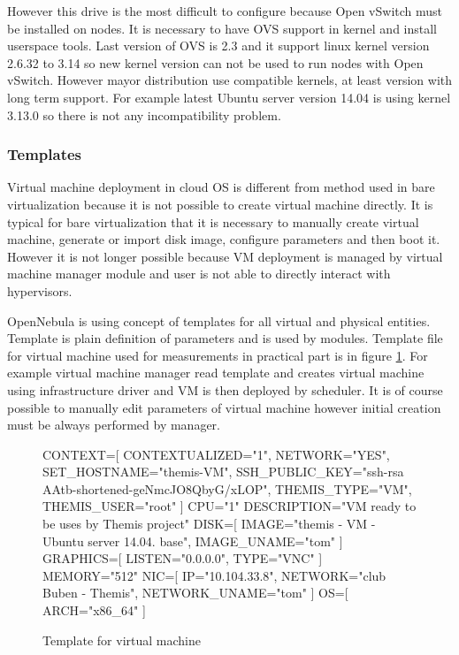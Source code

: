 However this drive is the most difficult to configure because Open vSwitch must be installed on nodes. It is necessary to have \Ac{OVS} support in kernel and install userspace tools. Last version of \Ac{OVS} is 2.3 and it support linux kernel version 2.6.32 to 3.14 so new kernel version can not be used to run nodes with Open vSwitch. However mayor distribution use compatible kernels, at least version with long term support. For example latest Ubuntu server version 14.04 is using kernel 3.13.0 so there is not any incompatibility problem.

\subsubsection{Templates}
Virtual machine deployment in cloud \Ac{OS} is different from method used in bare virtualization because it is not possible to create virtual machine directly. It is typical for bare virtualization that it is necessary to manually create virtual machine, generate or import disk image, configure parameters and then boot it. However it is not longer possible because \Ac{VM} deployment is managed by virtual machine manager module and user is not able to directly interact with hypervisors. 

OpenNebula is using concept of templates for all virtual and physical entities. Template is plain definition of parameters and is used by modules. Template file for virtual machine used for measurements in practical part is in figure \ref{code:template}. For example virtual machine manager read template and creates virtual machine using infrastructure driver and \Ac{VM} is then deployed by scheduler. It is of course possible to manually edit parameters of virtual machine however initial creation must be always performed by manager.

\begin{figure}[htb]
\caption{Template for virtual machine}
\label{code:template}
\begin{verbatimtab}
CONTEXT=[
	CONTEXTUALIZED="1",
	NETWORK="YES",
	SET_HOSTNAME="themis-VM",
	SSH_PUBLIC_KEY="ssh-rsa AAtb-shortened-geNmcJO8QbyG/xLOP",
	THEMIS_TYPE="VM",
	THEMIS_USER="root"
	]
CPU="1"
DESCRIPTION="VM ready to be uses by Themis project"
DISK=[
	IMAGE="themis - VM - Ubuntu server 14.04. base",
	IMAGE_UNAME="tom"
	]
GRAPHICS=[
	LISTEN="0.0.0.0",
	TYPE="VNC"
	]
MEMORY="512"
NIC=[
	IP="10.104.33.8",
	NETWORK="club Buben - Themis",
	NETWORK_UNAME="tom"
	]
OS=[
	ARCH="x86_64"
	]
\end{verbatimtab}
\end{figure}

